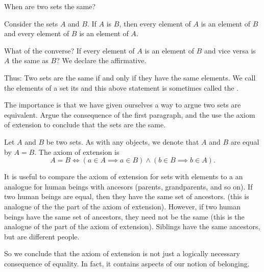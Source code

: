 

When are two
sets the same?


Consider the sets
$A$ and $B$.
If $A$ is $B$,
then every element of
$A$ is an element of
$B$ and every element
of $B$ is an element of
$A$.

What of the converse?
If every element of $A$
is an element of $B$
and vice versa is $A$
the same as $B$?
We declare the affirmative.

Thus:
Two sets are
the same if and only
if they have the same
elements.
We call the elements of a set
its  and
this above statement
is sometimes called the
.

The importance is that we have
given ourselves a way to argue
two sets are equivalent. Argue
the consequence of the first
paragraph, and the use the
axiom of extension to conclude
that the sets are the same.


Let $A$ and $B$ be
two sets.
As with any objects,
we denote that
$A$ and $B$
are equal
by $A = B$.
The axiom of extension is
\[
  A = B \Leftrightarrow (a \in A \implies a \in B) \land (b \in B \implies b \in A).
\]


It is useful to compare the axiom
of extension for sets with elements
to a an analogue for human beings
with ancesors (parents, grandparents,
and so on).
If two human beings are equal,
then they have the same set of ancestors.
(this is analogue of the the  part of
the axiom of extension).
However, if two human beings have
the same set of ancestors, they need
not be the same (this is the analogue of the
 part of the axiom
of extension).
Siblings have the same ancestors,
but are different people.

So we conclude that the axiom of extension
is not just a logically necessary consequence
of equality.
In fact, it contains aspects of our notion
of belonging.

